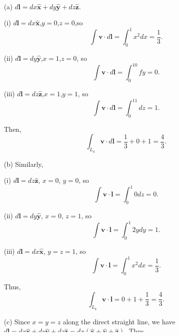 \begin{sol}[1.29]~\\
    \noindent (a) $d\mathbf{l} = dx\mathbf{\hat{x}} + dy\mathbf{\hat{y}} + dz\mathbf{\hat{z}}$.

    (i) $d\mathbf{l} = dx \mathbf{\hat{x}}$,$y=0$,$z=0$,so
    \begin{equation}
        \int \mathbf{v}\cdot d\mathbf{l} = \int^1_0 x^2 dx = \frac{1}{3}.
    \end{equation}

    (ii) $d\mathbf{l} = dy \mathbf{\hat{y}}$,$x=1$,$z=0$, so
    \begin{equation}
        \int \mathbf{v}\cdot d\mathbf{l} = \int_0^10 fy = 0.
    \end{equation}

    (iii) $d\mathbf{l} = dz\mathbf{\hat{z}}$,$x=1$,$y=1$, so
    \begin{equation}
        \int \mathbf{v}\cdot d\mathbf{l} = \int_0^11dz = 1.
    \end{equation}

    Then,
    \begin{equation}
        \int_{L_a} \mathbf{v}\cdot d\mathbf{l} = \frac{1}{3} + 0 + 1 = \frac{4}{3}.
    \end{equation}

    \noindent (b) Similarly,

    (i) $d\mathbf{l} = dz \mathbf{\hat{z}}$, $x = 0$, $y = 0$, so
    \begin{equation}
        \int \mathbf{v} \cdot\mathbf{l} = \int_0^1 0dz = 0.
    \end{equation}

    (ii) $d\mathbf{l} = dy\mathbf{\hat{y}}$, $x = 0$, $z = 1$, so
    \begin{equation}
        \int \mathbf{v} \cdot\mathbf{l} = \int_0^1 2ydy = 1.
    \end{equation}

    (iii) $d\mathbf{l} = dx\mathbf{\hat{x}}$, $y = z = 1$, so
    \begin{equation}
        \int\mathbf{v}\cdot\mathbf{l} = \int_0^1x^2dx = \frac{1}{3}.
    \end{equation}

    Thus,
    \begin{equation}
        \int_{L_b}\mathbf{v}\cdot\mathbf{l} = 0 + 1 + \frac{1}{3} = \frac{4}{3}.
    \end{equation}

    \noindent (c) Since $x = y = z$ along the direct straight line, we have $d\mathbf{l} = dx\mathbf{\hat{x}} + dy\mathbf{\hat{y}} + dz\mathbf{\hat{z}} = dx(\mathbf{\hat{x}} + \mathbf{\hat{y}} + \mathbf{\hat{z}})$. Thus,
    \begin{equation}
        \int_L \mathbf{v}\cdot\mathbf{l} = \int_0^14x^2dx = \frac{4}{3}.
    \end{equation}

    \noindent (d)
    \begin{equation}
        \oint\mathbf{v}\cdot\mathbf{l} = \int_{La}\mathbf{v}\cdot\mathbf{l} - \int_{L_b}\mathbf{v}\cdot\mathbf{l} = 0.
    \end{equation}
\end{sol}

